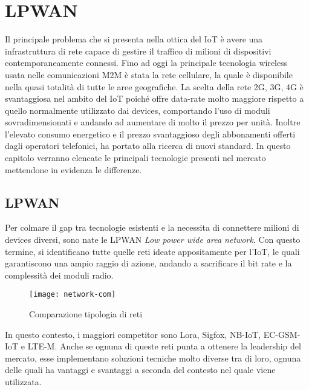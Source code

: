 \chapter{LPWAN}
Il principale problema che si presenta nella ottica del IoT è avere una
infrastruttura di rete capace di gestire il traffico di milioni di dispositivi
contemporaneamente connessi. Fino ad oggi la principale tecnologia wireless
usata nelle comunicazioni M2M è stata la rete cellulare, la quale è disponibile
nella quasi totalità di tutte le aree geografiche.  La scelta della rete 2G, 3G,
4G è svantaggiosa nel ambito del IoT poiché offre data-rate molto maggiore
rispetto a quello normalmente utilizzato dai devices, comportando l'uso
di moduli sovradimensionati e andando ad aumentare di molto il prezzo per unità.
Inoltre l'elevato consumo energetico e il prezzo svantaggioso degli abbonamenti
offerti dagli operatori telefonici, ha portato alla ricerca di nuovi standard.
In questo capitolo verranno elencate le principali tecnologie presenti nel
mercato mettendone in evidenza le differenze.

\section{LPWAN}
Per colmare il gap tra tecnologie esistenti e la necessita di connettere milioni
di devices diversi, sono nate le  LPWAN \emph{Low power wide area network}.
Con questo termine, si identificano tutte quelle reti ideate appositamente per
l'IoT, le quali garantiscono una ampio raggio di azione, andando a sacrificare
il bit rate e la complessità dei moduli radio.

\begin{figure}[h]
    \centering 
        \texttt{[image: network-com]}
    \caption{Comparazione tipologia di reti}
\end{figure}

In questo contesto, i maggiori competitor sono Lora, Sigfox, NB-IoT, EC-GSM-IoT
e LTE-M.  Anche se ognuna di queste reti punta a ottenere la leadership del
mercato, esse implementano soluzioni tecniche molto diverse tra di loro, ognuna
delle quali ha vantaggi e svantaggi a seconda del contesto nel quale viene
utilizzata.


